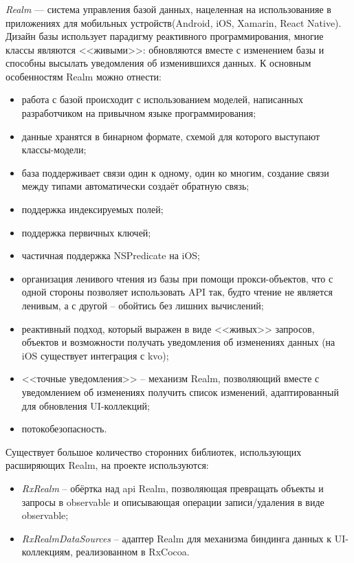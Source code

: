 \subsubsection{}
\label{sec:development:arch:ios:realm}

\emph{Realm} --- система управления базой данных, нацеленная на использованияе в приложениях для мобильных устройств(Android, iOS, Xamarin, React Native). Дизайн базы использует парадигму реактивного программирования, многие классы являются <<живыми>>: обновляются вместе с изменением базы и способны высылать уведомления об изменившихся данных. К основным особенностям Realm можно отнести:

\begin{itemize}
	\item работа с базой происходит с использованием моделей, написанных разработчиком на привычном языке программирования;
	\item данные хранятся в бинарном формате, схемой для которого выступают классы-модели;
	\item база поддерживает связи один к одному, один ко многим, создание связи между типами автоматически создаёт обратную связь;
	\item поддержка индексируемых полей;
	\item поддержка первичных ключей;
	\item частичная поддержка NSPredicate на iOS;
	\item организация ленивого чтения из базы при помощи прокси-объектов, что с одной стороны позволяет использовать API так, будто чтение не является ленивым, а с другой -- обойтись без лишних вычислений;
	\item реактивный подход, который выражен в виде <<живых>> запросов, объектов и возможности получать уведомления об изменениях данных (на iOS существует интеграция с \gls{kvo});
	\item <<точные уведомления>> -- механизм Realm, позволяющий вместе с уведомлением об изменениях получить список изменений, адаптированный для обновления UI-коллекций;
	\item потокобезопасность.
\end{itemize}

Существует большое количество сторонних библиотек, использующих расширяющих Realm, на проекте используются:

\begin{itemize}
	\item \emph{RxRealm} -- обёртка над \gls{api} Realm, позволяющая превращать объекты и запросы в \gls{observable} и описывающая операции записи/удаления в виде \gls{observable};
	\item \emph{RxRealmDataSources} -- адаптер Realm для механизма биндинга данных к UI-коллекциям, реализованном в RxCocoa.
\end{itemize}